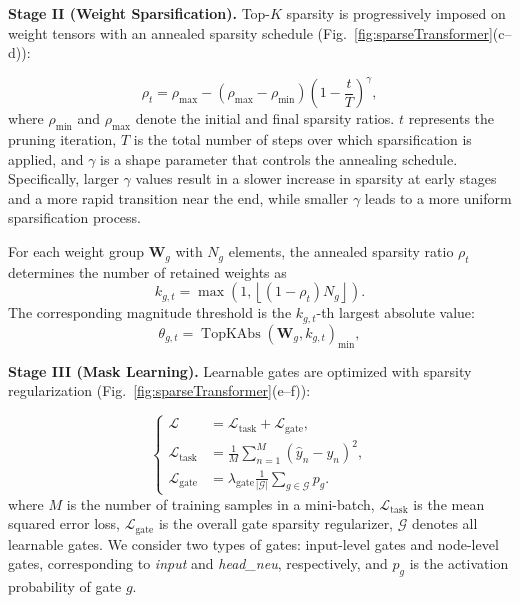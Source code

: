 \textbf{Stage II (Weight Sparsification).}
Top-$K$ sparsity is progressively imposed on weight tensors with an annealed sparsity schedule\cite{zhu2017prunepruneexploringefficacy} (Fig.~\ref{fig:sparseTransformer}(c--d)):

\begin{equation}
    \rho_t=\rho_{\max}-(\rho_{\max}-\rho_{\min})\left(1-\frac{t}{T}\right)^{\gamma},
\end{equation}
where $\rho_{\min}$ and $\rho_{\max}$ denote the initial and final sparsity ratios. $t$ represents the pruning iteration, $T$ is the total number of steps over which sparsification is applied, and $\gamma$ is a shape parameter that controls the annealing schedule. Specifically, larger $\gamma$ values result in a slower increase in sparsity at early stages and a more rapid transition near the end, while smaller $\gamma$ leads to a more uniform sparsification process.

For each weight group $\mathbf{W}_g$ with $N_g$ elements, the annealed sparsity ratio $\rho_t$ determines the number of retained weights as
\begin{equation}
    k_{g,t}=\max\left(1,\left\lfloor(1-\rho_t)N_g\right\rfloor\right).
\end{equation}
The corresponding magnitude threshold is the $k_{g,t}$-th largest absolute value:
\begin{equation}
    \theta_{g,t}=\operatorname{TopKAbs}(\mathbf{W}_g, k_{g,t})_{\min},
\end{equation}

\textbf{Stage III (Mask Learning).}
Learnable gates are optimized with sparsity regularization (Fig.~\ref{fig:sparseTransformer}(e--f))\cite{NEURIPS2019_1113d7a7}:

\begin{equation}
\left\{
\begin{aligned}
\mathcal{L} &= \mathcal{L}_{\mathrm{task}}+\mathcal{L}_{\mathrm{gate}}, \\
\mathcal{L}_{\mathrm{task}} &= \frac{1}{M}\sum_{n=1}^{M}(\hat{y}_n-y_n)^2, \\
\mathcal{L}_{\mathrm{gate}} &= \lambda_{\mathrm{gate}}\frac{1}{|\mathcal{G}|}\sum_{g\in\mathcal{G}} p_g.
\end{aligned}
\right.
\end{equation}
where $M$ is the number of training samples in a mini-batch, $\mathcal{L}_{\mathrm{task}}$ is the mean squared error loss, $\mathcal{L}_{\mathrm{gate}}$ is the overall gate sparsity regularizer, $\mathcal{G}$ denotes all learnable gates. We consider two types of gates: input-level gates and node-level gates, corresponding to \textit{input} and \textit{head\_neu}, respectively, and $p_g$ is the activation probability of gate $g$.

